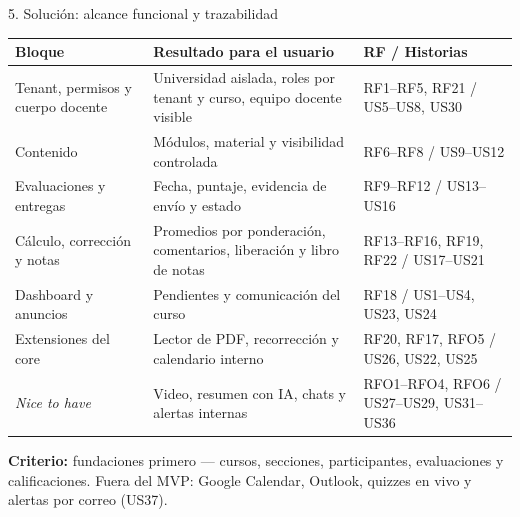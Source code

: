 \documentclass[aspectratio=169,10pt]{beamer}
\newcommand{\st}[1]{\textcolor{academixamber}{\textbf{#1}}}
\begin{document}
\begin{frame}[t]{5. Solución: alcance funcional y trazabilidad}
\footnotesize
\vspace{0.15cm}
\begin{tabularx}{\textwidth}{lYl}
\toprule
\textbf{Bloque} & \textbf{Resultado para el usuario} & \textbf{RF / Historias} \\
\midrule
Tenant, permisos y cuerpo docente & Universidad aislada, roles por tenant y curso, equipo docente visible & RF1--RF5, RF21 / US5--US8, US30 \\
Contenido & Módulos, material y visibilidad controlada & RF6--RF8 / US9--US12 \\
Evaluaciones y entregas & Fecha, puntaje, evidencia de envío y estado & RF9--RF12 / US13--US16 \\
Cálculo, corrección y notas & Promedios por ponderación, comentarios, liberación y libro de notas & RF13--RF16, RF19, RF22 / US17--US21 \\
Dashboard y anuncios & Pendientes y comunicación del curso & RF18 / US1--US4, US23, US24 \\
\midrule
Extensiones del core & Lector de PDF, recorrección y calendario interno & RF20, RF17, RFO5 / US26, US22, US25 \\
\emph{Nice to have} & Video, resumen con IA, chats y alertas internas & RFO1--RFO4, RFO6 / US27--US29, US31--US36 \\
\bottomrule
\end{tabularx}
\vspace{0.15cm}

{\footnotesize \st{Criterio:} fundaciones primero --- cursos, secciones, participantes, evaluaciones y calificaciones. Fuera del MVP: Google Calendar, Outlook, quizzes en vivo y alertas por correo (US37).}
\end{frame}
\end{document}
